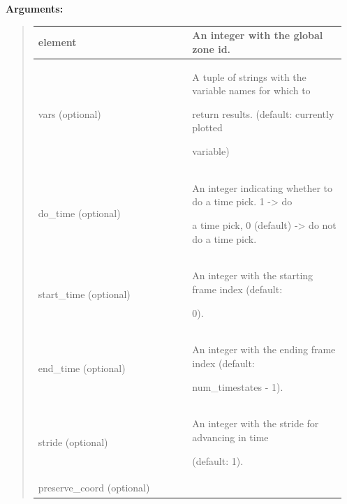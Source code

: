 \documentclass[letterpaper,10pt,english]{sphinxmanual}
\begin{document}
\begin{DUlineblock}{0em}
\item[] 
\item[] \textbf{Arguments:}
\end{DUlineblock}
\begin{quote}

\begin{tabular}{|p{0.475\linewidth}|p{0.475\linewidth}|}
\hline

element
 & 
An integer with the global zone id.
\\
\hline
vars (optional)
 & 
\begin{DUlineblock}{0em}
\item[] A tuple of strings with the variable names for which to
\item[] return results. (default: currently plotted
\item[] variable)
\end{DUlineblock}
\\
\hline
do\_time (optional)
 & 
\begin{DUlineblock}{0em}
\item[] An integer indicating whether to do a time pick. 1 -\textgreater{} do
\item[] a time pick, 0 (default) -\textgreater{} do not do a time pick.
\end{DUlineblock}
\\
\hline
start\_time (optional)
 & 
\begin{DUlineblock}{0em}
\item[] An integer with the starting frame index (default:
\item[] 0).
\end{DUlineblock}
\\
\hline
end\_time (optional)
 & 
\begin{DUlineblock}{0em}
\item[] An integer with the ending frame index (default:
\item[] num\_timestates - 1).
\end{DUlineblock}
\\
\hline
stride (optional)
 & 
\begin{DUlineblock}{0em}
\item[] An integer with the stride for advancing in time
\item[] (default: 1).
\end{DUlineblock}
\\
\hline
preserve\_coord (optional)
 & 
\begin{DUlineblock}{0em}

\end{DUlineblock}
\end{tabular}
\end{quote}
\end{document}
